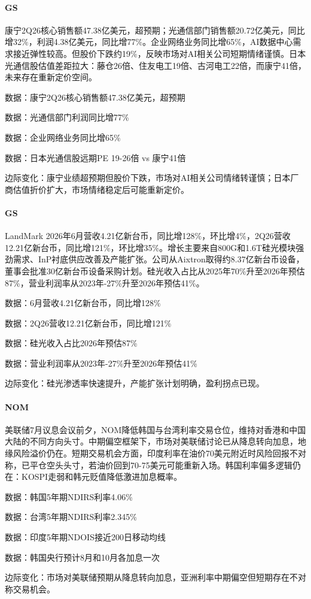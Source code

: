 \documentclass[11pt]{ctexart}
\begin{document}
\paragraph{GS} 康宁2Q26核心销售额47.38亿美元，超预期；光通信部门销售额20.72亿美元，同比增32\%，利润4.38亿美元，同比增77\%。企业网络业务同比增65\%，AI数据中心需求接近弹性较高。但股价下跌约19\%，反映市场对AI相关公司短期情绪谨慎。日本光通信股估值差距拉大：藤仓26倍、住友电工19倍、古河电工22倍，而康宁41倍，未来存在重新定价空间。
{\small\color{refgray}数据：康宁2Q26核心销售额47.38亿美元，超预期\par}
{\small\color{refgray}数据：光通信部门利润同比增77\%\par}
{\small\color{refgray}数据：企业网络业务同比增65\%\par}
{\small\color{refgray}数据：日本光通信股远期PE 19-26倍 vs 康宁41倍\par}
{\small\color{refgray}边际变化：康宁业绩超预期但股价下跌，市场对AI相关公司情绪转谨慎；日本厂商估值折价扩大，市场情绪稳定后可能重新定价。\par}
\paragraph{GS} LandMark 2026年6月营收4.21亿新台币，同比增128\%，环比增4\%，2Q26营收12.21亿新台币，同比增121\%，环比增35\%。增长主要来自800G和1.6T硅光模块强劲需求、InP衬底供应改善及产能扩张。公司从Aixtron取得约8.37亿新台币设备，董事会批准30亿新台币设备采购计划。硅光收入占比从2025年70\%升至2026年预估87\%，营业利润率从2023年-27\%升至2026年预估41\%。
{\small\color{refgray}数据：6月营收4.21亿新台币，同比增128\%\par}
{\small\color{refgray}数据：2Q26营收12.21亿新台币，同比增121\%\par}
{\small\color{refgray}数据：硅光收入占比2026年预估87\%\par}
{\small\color{refgray}数据：营业利润率从2023年-27\%升至2026年预估41\%\par}
{\small\color{refgray}边际变化：硅光渗透率快速提升，产能扩张计划明确，盈利拐点已现。\par}
\paragraph{NOM} 美联储7月议息会议前夕，NOM降低韩国与台湾利率交易仓位，维持对香港和中国大陆的不同方向头寸。中期偏空框架下，市场对美联储讨论已从降息转向加息，地缘风险溢价仍在。短期交易机会方面，印度利率在油价70美元附近时风险回报不对称，已平仓空头头寸，若油价回到70-75美元可能重新入场。韩国利率偏多逻辑仍在：KOSPI走弱和韩元贬值降低激进加息概率。
{\small\color{refgray}数据：韩国5年期NDIRS利率4.06\%\par}
{\small\color{refgray}数据：台湾5年期NDIRS利率2.345\%\par}
{\small\color{refgray}数据：印度5年期NDOIS接近200日移动均线\par}
{\small\color{refgray}数据：韩国央行预计8月和10月各加息一次\par}
{\small\color{refgray}边际变化：市场对美联储预期从降息转向加息，亚洲利率中期偏空但短期存在不对称交易机会。\par}
\end{document}
